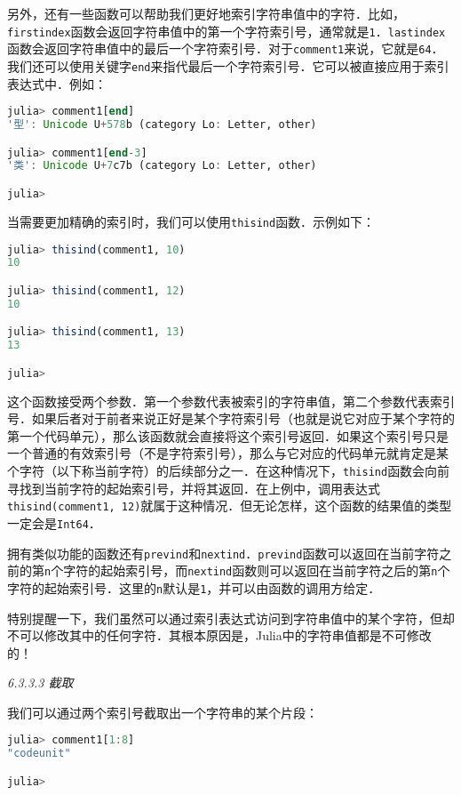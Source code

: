 另外，还有一些函数可以帮助我们更好地索引字符串值中的字符．比如，\verb|firstindex|函数会返回字符串值中的第一个字符索引号，通常就是\verb|1|．\verb|lastindex|函数会返回字符串值中的最后一个字符索引号．对于\verb|comment1|来说，它就是\verb|64|．我们还可以使用关键字\verb|end|来指代最后一个字符索引号．它可以被直接应用于索引表达式中．例如：
\begin{lstlisting}[language=julia]
julia> comment1[end]
'型': Unicode U+578b (category Lo: Letter, other)

julia> comment1[end-3]
'类': Unicode U+7c7b (category Lo: Letter, other)

julia> 
\end{lstlisting}

当需要更加精确的索引时，我们可以使用\verb|thisind|函数．示例如下：
\begin{lstlisting}[language=julia]
julia> thisind(comment1, 10)
10

julia> thisind(comment1, 12)
10

julia> thisind(comment1, 13)
13

julia> 
\end{lstlisting}

这个函数接受两个参数．第一个参数代表被索引的字符串值，第二个参数代表索引号．如果后者对于前者来说正好是某个字符索引号（也就是说它对应于某个字符的第一个代码单元），那么该函数就会直接将这个索引号返回．如果这个索引号只是一个普通的有效索引号（不是字符索引号），那么与它对应的代码单元就肯定是某个字符（以下称当前字符）的后续部分之一．在这种情况下，\verb|thisind|函数会向前寻找到当前字符的起始索引号，并将其返回．在上例中，调用表达式\verb|thisind(comment1, 12)|就属于这种情况．但无论怎样，这个函数的结果值的类型一定会是\verb|Int64|．

拥有类似功能的函数还有\verb|prevind|和\verb|nextind|．\verb|prevind|函数可以返回在当前字符之前的第\verb|n|个字符的起始索引号，而\verb|nextind|函数则可以返回在当前字符之后的第\verb|n|个字符的起始索引号．这里的\verb|n|默认是\verb|1|，并可以由函数的调用方给定．

特别提醒一下，我们虽然可以通过索引表达式访问到字符串值中的某个字符，但却不可以修改其中的任何字符．其根本原因是，Julia中的字符串值都是不可修改的！

\textsl{6.3.3.3 截取}

我们可以通过两个索引号截取出一个字符串的某个片段：
\begin{lstlisting}[language=julia]
julia> comment1[1:8]
"codeunit"

julia> 
\end{lstlisting}

